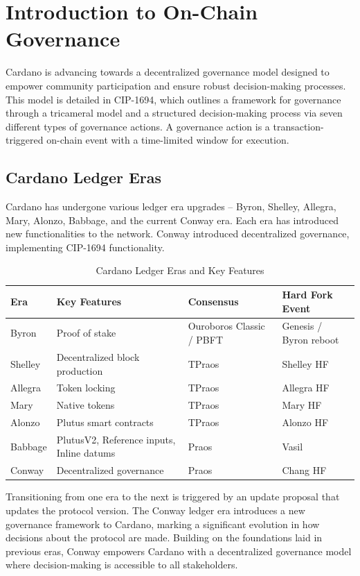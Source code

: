 
\section{Introduction to On-Chain Governance} \label{sec:governance-intro}

Cardano is advancing towards a decentralized governance model designed to empower community participation and ensure robust decision-making processes. This model is detailed in CIP-1694, which outlines a framework for governance through a tricameral model and a structured decision-making process via seven different types of governance actions. A governance action is a transaction-triggered on-chain event with a time-limited window for execution.

\subsection{Cardano Ledger Eras}

Cardano has undergone various ledger era upgrades -- Byron, Shelley, Allegra, Mary, Alonzo, Babbage, and the current Conway era. Each era has introduced new functionalities to the network. Conway introduced decentralized governance, implementing CIP-1694 functionality.

\begin{table}[ht]
\centering
\small
\begin{tabular}{|l|l|l|l|}
\hline
\textbf{Era} & \textbf{Key Features} & \textbf{Consensus} & \textbf{Hard Fork Event} \\ \hline
Byron & Proof of stake & Ouroboros Classic / PBFT & Genesis / Byron reboot \\ \hline
Shelley & Decentralized block production & TPraos & Shelley HF \\ \hline
Allegra & Token locking & TPraos & Allegra HF \\ \hline
Mary & Native tokens & TPraos & Mary HF \\ \hline
Alonzo & Plutus smart contracts & TPraos & Alonzo HF \\ \hline
Babbage & PlutusV2, Reference inputs, Inline datums & Praos & Vasil \\ \hline
Conway & Decentralized governance & Praos & Chang HF \\ \hline
\end{tabular}
\caption{Cardano Ledger Eras and Key Features}
\end{table}

Transitioning from one era to the next is triggered by an update proposal that updates the protocol version. The Conway ledger era introduces a new governance framework to Cardano, marking a significant evolution in how decisions about the protocol are made. Building on the foundations laid in previous eras, Conway empowers Cardano with a decentralized governance model where decision-making is accessible to all stakeholders.

